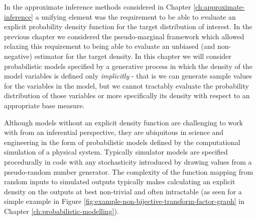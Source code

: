 In the approximate inference methods considered in Chapter \ref{ch:approximate-inference} a unifying element was the requirement to be able to evaluate an explicit probability density function for the target distribution of interest. In the previous chapter we considered the pseudo-marginal framework which allowed relaxing this requirement to being able to evaluate an unbiased (and non-negative) estimator for the target density. In this chapter we will consider probabilistic models specified by a generative process in which the density of the model variables is defined only \emph{implicitly} \citep{beaumont2002approximate,gourieroux1993indirect,diggle1984monte} - that is we can generate sample values for the variables in the model, but we cannot tractably evaluate the probability distribution of those variables or more specifically its density with respect to an appropriate base measure. 

Although models without an explicit density function are challenging to work with from an inferential perspective, they are ubiquitous in science and engineering in the form of probabilistic models defined by the computational simulation of a physical system. Typically simulator models are specified procedurally in code with any stochasticity introduced by drawing values from a pseudo-random number generator. %
The complexity of the function mapping from random inputs to simulated outputs typically makes calculating an explicit density on the outputs at best non-trivial and often intractable (as seen for a simple example in Figure \ref{fig:example-non-bijective-transform-factor-graph} in Chapter \ref{ch:probabilistic-modelling}).

